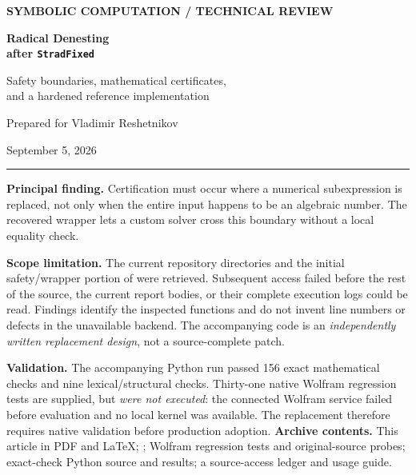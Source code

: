 \documentclass[11pt,letterpaper]{article}
\numberwithin{equation}{section}
\theoremstyle{definition}\newtheorem{definition}[theorem]{Definition}
\theoremstyle{remark}\newtheorem{remark}[theorem]{Remark}
\newcommand{\code}[1]{\texttt{\detokenize{#1}}}
\begin{document}
\begin{titlepage}
\thispagestyle{empty}
{\small\sffamily\bfseries\color{ink} SYMBOLIC COMPUTATION \quad / \quad TECHNICAL REVIEW}\par
\vspace{0.5in}
{\Huge\bfseries Radical Denesting\\[6pt] after \texttt{StradFixed}\par}
\vspace{0.25in}
{\LARGE Safety boundaries, mathematical certificates,\\and a hardened reference implementation\par}
\vspace{0.3in}
{\large Prepared for Vladimir Reshetnikov\par}
{\large September 5, 2026\par}
\vspace{0.25in}\noindent\textcolor{ink}{\rule{\textwidth}{1pt}}
\vspace{0.1in}
\noindent\textbf{Principal finding.} Certification must occur where a numerical subexpression is replaced, not only when the entire input happens to be an algebraic number. The recovered wrapper lets a custom solver cross this boundary without a local equality check.
\vspace{0.18in}

\noindent\textbf{Scope limitation.} The current repository directories and the initial safety/wrapper portion of \code{StradFixed.wl} were retrieved. Subsequent access failed before the rest of the source, the current report bodies, or their complete execution logs could be read. Findings identify the inspected functions and do not invent line numbers or defects in the unavailable backend. The accompanying code is an \emph{independently written replacement design}, not a source-complete patch.
\vspace{0.18in}

\noindent\textbf{Validation.} The accompanying Python run passed 156 exact mathematical checks and nine lexical/structural checks. Thirty-one native Wolfram regression tests are supplied, but \emph{were not executed}: the connected Wolfram service failed before evaluation and no local kernel was available. The replacement therefore requires native validation before production adoption.
\vfill
\noindent\textbf{Archive contents.} This article in PDF and LaTeX; \code{StradImproved.wl}; Wolfram regression tests and original-source probes; exact-check Python source and results; a source-access ledger and usage guide.
\end{titlepage}
\end{document}
